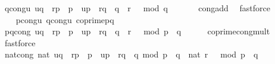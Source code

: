 \begin{isabellebody}
\ q{\isacharunderscore}{\kern0pt}cong{\isacharunderscore}{\kern0pt}u{}{\isacharcolon}{\kern0pt}\ {\isachardoublequoteopen}{\isacharbrackleft}{\kern0pt}{\isacharparenleft}{\kern0pt}{\isacharquery}{\kern0pt}uq\ {\isacharasterisk}{\kern0pt}\ r{\isacharunderscore}{\kern0pt}p\ {\isacharasterisk}{\kern0pt}\ p\ {\isacharplus}{\kern0pt}\ {\isacharquery}{\kern0pt}up\ {\isacharasterisk}{\kern0pt}\ r{\isacharunderscore}{\kern0pt}q\ {\isacharasterisk}{\kern0pt}\ q{\isacharparenright}{\kern0pt}\ {\isacharequal}{\kern0pt}\ {\isacharparenleft}{\kern0pt}r\ {\isacharcircum}{\kern0pt}\ {}{\isacharparenright}{\kern0pt}{\isacharbrackright}{\kern0pt}\ {\isacharparenleft}{\kern0pt}mod\ q{\isacharparenright}{\kern0pt}{\isachardoublequoteclose}\ \isanewline
\ \ \ \ \isamarkupfalse%
\ cong{\isacharunderscore}{\kern0pt}add\ \isamarkupfalse%
\ fastforce\isanewline
\isanewline
\isanewline
\isanewline
\ \ \isanewline
\ \ \isanewline
\ \ \isamarkupfalse%
\ p{\isacharunderscore}{\kern0pt}cong{\isacharunderscore}{\kern0pt}u{}\ q{\isacharunderscore}{\kern0pt}cong{\isacharunderscore}{\kern0pt}u{}\ coprime{\isacharunderscore}{\kern0pt}pq\isanewline
\ \ \isamarkupfalse%
\ pq{\isacharunderscore}{\kern0pt}cong{\isacharcolon}{\kern0pt}\ {\isachardoublequoteopen}{\isacharbrackleft}{\kern0pt}{\isacharparenleft}{\kern0pt}{\isacharquery}{\kern0pt}uq\ {\isacharasterisk}{\kern0pt}\ r{\isacharunderscore}{\kern0pt}p\ {\isacharasterisk}{\kern0pt}\ p\ {\isacharplus}{\kern0pt}\ {\isacharquery}{\kern0pt}up\ {\isacharasterisk}{\kern0pt}\ r{\isacharunderscore}{\kern0pt}q\ {\isacharasterisk}{\kern0pt}\ q{\isacharparenright}{\kern0pt}\ {\isacharequal}{\kern0pt}\ {\isacharparenleft}{\kern0pt}r\ {\isacharcircum}{\kern0pt}\ {}{\isacharparenright}{\kern0pt}{\isacharbrackright}{\kern0pt}\ {\isacharparenleft}{\kern0pt}mod\ {\isacharparenleft}{\kern0pt}p\ {\isacharasterisk}{\kern0pt}\ q{\isacharparenright}{\kern0pt}{\isacharparenright}{\kern0pt}{\isachardoublequoteclose}\isanewline
\ \ \ \ \isamarkupfalse%
\ coprime{\isacharunderscore}{\kern0pt}cong{\isacharunderscore}{\kern0pt}mult\ \isamarkupfalse%
\ fastforce\isanewline
\ \ \isamarkupfalse%
\ \isamarkupfalse%
\ nat{\isacharunderscore}{\kern0pt}cong{\isacharcolon}{\kern0pt}\ {\isachardoublequoteopen}nat\ {\isacharparenleft}{\kern0pt}{\isacharparenleft}{\kern0pt}{\isacharquery}{\kern0pt}uq\ {\isacharasterisk}{\kern0pt}\ r{\isacharunderscore}{\kern0pt}p\ {\isacharasterisk}{\kern0pt}\ p\ {\isacharplus}{\kern0pt}\ {\isacharquery}{\kern0pt}up\ {\isacharasterisk}{\kern0pt}\ r{\isacharunderscore}{\kern0pt}q\ {\isacharasterisk}{\kern0pt}\ q{\isacharparenright}{\kern0pt}\ mod\ {\isacharparenleft}{\kern0pt}p\ {\isacharasterisk}{\kern0pt}\ q{\isacharparenright}{\kern0pt}{\isacharparenright}{\kern0pt}\ {\isacharequal}{\kern0pt}\ nat\ {\isacharparenleft}{\kern0pt}r\ {\isacharcircum}{\kern0pt}\ {}{\isacharparenright}{\kern0pt}\ mod\ {\isacharparenleft}{\kern0pt}p\ {\isacharasterisk}{\kern0pt}\ q{\isacharparenright}{\kern0pt}{\isachardoublequoteclose}\ \isanewline

\end{isabellebody}
